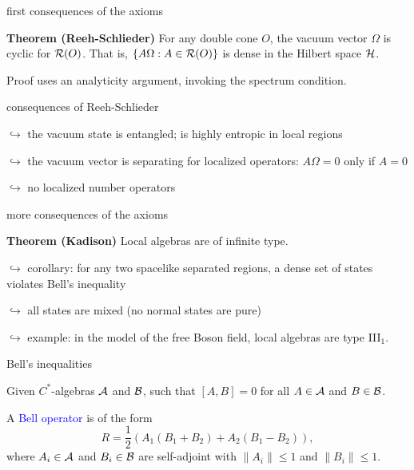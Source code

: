 \documentclass[8pt]{beamer}
\begin{document}
\begin{frame}{first consequences of the axioms}


  \bigskip \textbf{Theorem (Reeh-Schlieder)} For any double cone $O$,
  the vacuum vector $\Omega$ is cyclic for $\mathcal R (O)$.  That is, $\{
  A\Omega :A\in \mathcal R (O) \}$ is dense in the Hilbert space $\mathcal H$.

  \bigskip Proof uses an analyticity argument, invoking the spectrum
  condition.

\end{frame}
\begin{frame}{consequences of Reeh-Schlieder}

  \bigskip \hspace*{2em} $\hookrightarrow$ the vacuum state is
  entangled; is highly entropic in local regions

  \bigskip \hspace*{2em} $\hookrightarrow$ the vacuum vector is
  separating for localized operators: $A\Omega =0$ only if $A=0$

  \bigskip \hspace*{2em} $\hookrightarrow$ no localized number
  operators

\end{frame}

\begin{frame}{more consequences of the axioms}

  \textbf{Theorem (Kadison)} Local algebras are of infinite type.

  \bigskip \hspace*{2em} $\hookrightarrow$ corollary: for any two
  spacelike separated regions, a dense set of states violates Bell's
  inequality

  \bigskip \hspace*{2em} $\hookrightarrow$ all states are mixed (no
  normal states are pure)

\bigskip \hspace*{2em} $\hookrightarrow$ example: in the model of the
free Boson field, local algebras are type III$_1$.

\end{frame}


\begin{frame}{Bell's inequalities}

  Given $C^*$-algebras $\mathcal A$ and $\mathcal B$, such that $[A,B]= 0$ for all
  $A\in \mathcal A$ and $B\in \mathcal B$.

A \textcolor{blue}{Bell operator} is of the form
$$ R = \frac{1}{2}(A_1(B_1+B_2)+A_2(B_1-B_2)) ,$$
where $A_i\in \mathcal A$ and $B_i\in \mathcal B$ are self-adjoint with
$\| A_i\| \leq 1$ and $\| B_i \|\leq 1$.



\end{frame}
\end{document}
